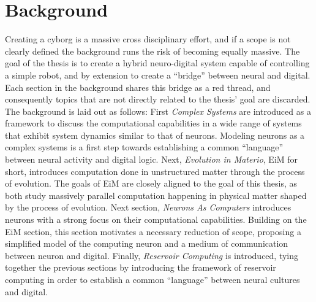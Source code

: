 \chapter{Background}
Creating a cyborg is a massive cross disciplinary effort, and if a scope is not
clearly defined the background runs the risk of becoming equally massive.
The goal of the thesis is to create a hybrid neuro-digital system capable of
controlling a simple robot, and by extension to create a ``bridge'' between
neural and digital.
Each section in the background shares this bridge as a red thread, and
consequently topics that are not directly related to the thesis' goal are discarded.
The background is laid out as follows:
First \emph{Complex Systems} are introduced as a framework to discuss the computational
capabilities in a wide range of systems that exhibit system dynamics similar to
that of neurons.
Modeling neurons as a complex systems is a first step towards establishing a
common ``language'' between neural activity and digital logic.
%
Next, \emph{Evolution in Materio}, EiM for short, introduces computation done in
unstructured matter through the process of evolution.
The goals of EiM are closely aligned to the goal of this thesis, as both study
massively parallel computation happening in physical matter shaped by the
process of evolution.
%
Next section, \emph{Neurons As Computers} introduces neurons with a strong focus
on their computational capabilities.
Building on the EiM section, this section motivates a necessary reduction of
scope, proposing a simplified model of the computing neuron and a medium of
communication between neuron and digital.
%
Finally, \emph{Reservoir Computing} is introduced, tying together the previous
sections by introducing the framework of reservoir computing in order to
establish a common ``language'' between neural cultures and digital.
